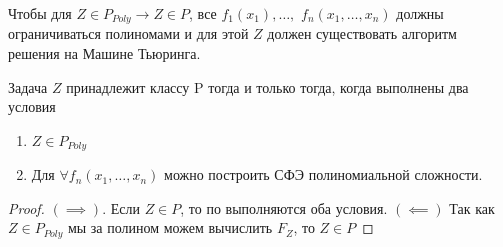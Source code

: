 \begin{proposition}
	Чтобы для $Z\in P_{Poly} \to Z \in P$, все $f_1(x_1), \ldots, $ $f_n(x_1,
	\ldots, x_n)$ должны ограничиваться полиномами и для этой $Z$ должен
	существовать алгоритм решения на Машине Тьюринга. 
\end{proposition}


\begin{theorem}
	Задача $Z $ принадлежит классу P тогда и только тогда, когда выполнены
	два условия 
	\begin{enumerate}
		\item $Z\in P_{Poly}$ 
		\item Для $\forall f_n(x_1, \ldots, x_n)$ можно построить СФЭ
			полиномиальной сложности.
	\end{enumerate}
\end{theorem}
\begin{proof}
	$\left( \implies \right) $. Если $Z\in P$, то по 
	выполняются оба условия.
$\left( \impliedby \right) $ Так как $Z\in P_{Poly}$ мы за полином можем вычислить
	$F_Z$, то $Z\in P$
\end{proof}



